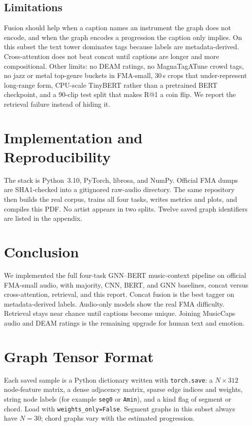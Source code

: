 \documentclass[conference]{IEEEtran}
\begin{document}
\subsection{Limitations}
Fusion should help when a caption names an instrument the graph does not encode, and when the graph encodes a progression the caption only implies. On this subset the text tower dominates tags because labels are metadata-derived. Cross-attention does not beat concat until captions are longer and more compositional. Other limits: no DEAM ratings, no MagnaTagATune crowd tags, no jazz or metal top-genre buckets in FMA-small, 30\,s crops that under-represent long-range form, CPU-scale TinyBERT rather than a pretrained BERT checkpoint, and a 90-clip test split that makes R@1 a coin flip. We report the retrieval failure instead of hiding it.

\section{Implementation and Reproducibility}
The stack is Python~3.10, PyTorch, librosa, and NumPy. Official FMA dumps are SHA1-checked into a gitignored raw-audio directory. The same repository then builds the real corpus, trains all four tasks, writes metrics and plots, and compiles this PDF. No artist appears in two splits. Twelve saved graph identifiers are listed in the appendix.

\section{Conclusion}
We implemented the full four-task GNN--BERT music-context pipeline on official FMA-small audio, with majority, CNN, BERT, and GNN baselines, concat versus cross-attention, retrieval, and this report. Concat fusion is the best tagger on metadata-derived labels. Audio-only models show the real FMA difficulty. Retrieval stays near chance until captions become unique. Joining MusicCaps audio and DEAM ratings is the remaining upgrade for human text and emotion.

\appendix
\section{Graph Tensor Format}
Each saved sample is a Python dictionary written with \texttt{torch.save}: a $N\times 312$ node-feature matrix, a dense adjacency matrix, sparse edge indices and weights, string node labels (for example \texttt{seg0} or \texttt{Amin}), and a kind flag of segment or chord. Load with \texttt{weights\_only=False}. Segment graphs in this subset always have $N=30$; chord graphs vary with the estimated progression.
\end{document}

